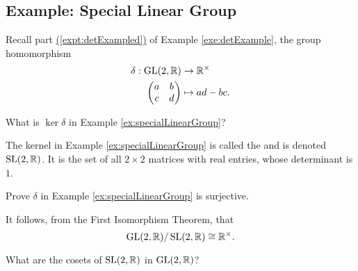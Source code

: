 \documentclass[../algebraNotesMSRI-UP2016.tex]{subfiles}
\begin{document}
\subsection[\subsecname]{Example: Special Linear Group}
\begin{frame}{\subsecname}
\begin{ex}\label{ex:specialLinearGroup}
Recall part \hyperref[expt:detExampled]{(\ref{expt:detExampled})} of Example \ref{exe:detExample}, the group homomorphism
\begin{align*}
\delta: \operatorname{GL}(2,\mathbb R) &\to \mathbb R^{\times} \\
	\begin{pmatrix}
		a & b \\
		c & d 
		\end{pmatrix} &\mapsto ad-bc.
\end{align*}
\end{ex}

\smallGap
\begin{que}
What is $\ker{\delta}$ in Example \ref{ex:specialLinearGroup}?
\end{que}
\end{frame}

\begin{frame}{}{}
The kernel in Example \ref{ex:specialLinearGroup} is called the  and is denoted $\operatorname{SL}(2,\mathbb R)$.  It is the set of all $2\times 2$ matrices with real entries, whose determinant is $1$.  %
\begin{exe}\label{exe:specialLinearGroup}
Prove $\delta$ in Example \ref{ex:specialLinearGroup} is surjective.
\end{exe}

\smallGap
It follows, from the First Isomorphism Theorem, that 
\[
\operatorname{GL}(2,\mathbb R)/\operatorname{SL}(2,\mathbb R)\cong \mathbb R^{\times}.
\]
\smallGap
\begin{que}
What are the cosets of $\operatorname{SL}(2,\mathbb R)$ in $\operatorname{GL}(2,\mathbb R)$?
\end{que}
\end{frame}
\end{document}
